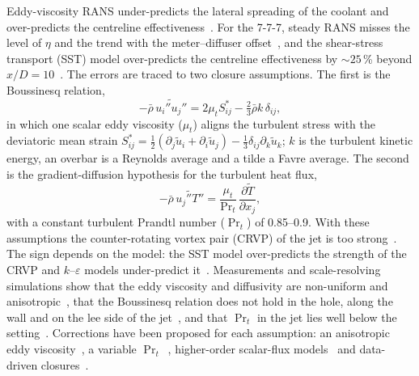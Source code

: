 \documentclass[colorlinks,upint,subscriptcorrection,varvw,hyphenate,balance,lineno]{asmeconf}
\begin{document}
Eddy-viscosity RANS under-predicts the lateral spreading of the coolant and over-predicts the centreline
effectiveness~\cite{acharya2001,harrison2008,foroutan2014,stratton2019}. For the 7-7-7, steady RANS misses the
level of $\eta$ and the trend with the meter--diffuser offset~\cite{haydt2017}, and the shear-stress transport (SST) model over-predicts
the centreline effectiveness by $\sim25$\,\% beyond $x/D=10$~\cite{laroche2023}. The errors are traced to two
closure assumptions. The first is the Boussinesq relation,
\begin{equation}\label{eq:boussinesq}
-\bar\rho\,\widetilde{u_i''u_j''}=2\mu_t S^*_{ij}-\tfrac{2}{3}\bar\rho k\,\delta_{ij},
\end{equation}
in which one scalar eddy viscosity ($\mu_t$) aligns the turbulent stress with the deviatoric mean strain
$S^*_{ij}=\tfrac12(\partial_j\tilde u_i+\partial_i\tilde u_j)-\tfrac13\delta_{ij}\partial_k\tilde u_k$; $k$ is the
turbulent kinetic energy, an overbar is a Reynolds average and a tilde a Favre average. The second is the
gradient-diffusion hypothesis for the turbulent heat flux,
\begin{equation}\label{eq:gdh}
-\bar\rho\,\widetilde{u_j''T''}=\frac{\mu_t}{\Pr\nolimits_t}\,\frac{\partial\tilde T}{\partial x_j},
\end{equation}
with a constant turbulent Prandtl number ($\Pr_t$) of 0.85--0.9. With these assumptions the counter-rotating
vortex pair (CRVP) of the jet is too strong~\cite{azzi2002,laroche2023}. The sign depends on the model: the SST
model over-predicts the strength of the CRVP and $k$--$\varepsilon$ models under-predict
it~\cite{stratton2019,coletti2013}. Measurements and scale-resolving simulations show that the eddy viscosity and
diffusivity are non-uniform and anisotropic~\cite{kaszeta2000,kohli2005,coletti2013}, that the Boussinesq relation
does not hold in the hole, along the wall and on the lee side of the jet~\cite{ling2016,stratton2019}, and that
$\Pr_t$ in the jet lies well below the setting~\cite{stratton2019}. Corrections have been proposed for each
assumption: an anisotropic eddy viscosity~\cite{azzi2002,lakehal2002}, a variable
$\Pr_t$~\cite{liu2008,liu2011}, higher-order scalar-flux models~\cite{ling2015} and data-driven
closures~\cite{milani2017,milani2020}.
\end{document}
